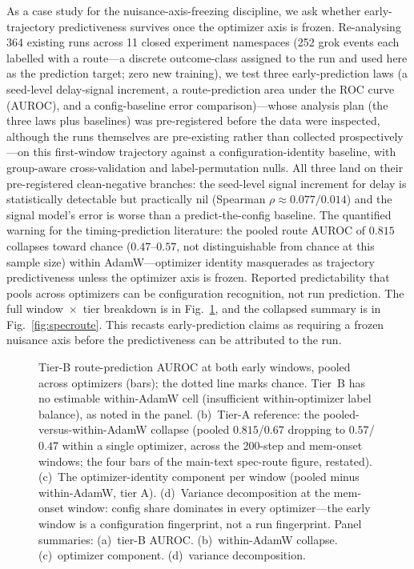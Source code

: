 \documentclass[11pt]{article}
\theoremstyle{plain}
\theoremstyle{definition}
\begin{document}
As a case study for the nuisance-axis-freezing discipline, we ask whether early-trajectory
predictiveness survives once the optimizer axis is frozen.
Re-analysing 364 existing runs across 11 closed experiment namespaces (252 grok events each
labelled with a route---a discrete outcome-class assigned to the run and used here as the
prediction target; zero new training), we test three early-prediction laws (a seed-level
delay-signal increment, a route-prediction area under the ROC curve (AUROC), and a config-baseline error
comparison)---whose analysis plan (the three laws plus baselines) was pre-registered before
the data were inspected, although the runs themselves are pre-existing rather than collected
prospectively---on this first-window trajectory against a configuration-identity baseline,
with group-aware cross-validation and label-permutation nulls. All three land on their pre-registered
clean-negative branches: the seed-level signal increment for delay is statistically
detectable but practically nil (Spearman $\rho \approx 0.077 / 0.014$) and the signal
model's error is worse than a predict-the-config baseline. The quantified warning
for the timing-prediction literature: the pooled route AUROC of $0.815$ collapses toward
chance ($0.47$--$0.57$, not distinguishable from chance at this sample size)
within AdamW---optimizer identity masquerades as trajectory
predictiveness unless the optimizer axis is frozen. Reported predictability that pools
across optimizers can be configuration recognition, not run prediction.
The full window~$\times$~tier breakdown is in Fig.~\ref{fig:route-matrix}, and the
collapsed summary is in Fig.~\ref{fig:specroute}. This recasts early-prediction claims
\citep{notsawo2023predicting, xu2026earlywarning} as requiring a frozen nuisance axis
before the predictiveness can be attributed to the run.

\begin{figure}[htbp]
\centering
{}
\caption{Tier-B route-prediction AUROC at both early windows, pooled across optimizers
(bars); the dotted line marks chance. Tier~B has no estimable within-AdamW cell
(insufficient within-optimizer label balance), as noted in the panel.
(b)~Tier-A reference: the pooled-versus-within-AdamW collapse (pooled $0.815$/$0.67$
dropping to $0.57$/$0.47$ within a single optimizer, across the 200-step and mem-onset
windows; the four bars of the main-text spec-route figure, restated).
(c)~The optimizer-identity component per window (pooled minus within-AdamW,
tier A).
(d)~Variance decomposition at the mem-onset window: config share dominates in
every optimizer---the early window is a configuration fingerprint, not a run
fingerprint.
Panel summaries: (a)~tier-B AUROC. (b)~within-AdamW collapse. (c)~optimizer component. (d)~variance decomposition.}
\label{fig:route-matrix}
\end{figure}
\end{document}
